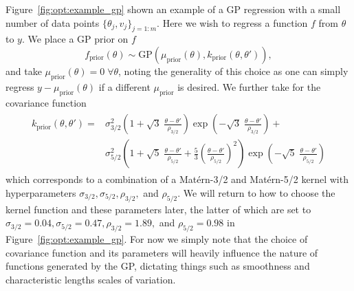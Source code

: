 Figure~\ref{fig:opt:example_gp} shown an example of a GP regression with a small
number of data points $\{\theta_j,{v}_j\}_{j=1:m}$.  Here we wish to regress a function $f$ 
from $\theta$ to $y$.  We place a GP prior on $f$
\[
f_{\mathrm{prior}} (\theta) \sim \mathrm{GP}\left(\mu_{\text{prior}} (\theta),k_{\text{prior}}(\theta,\theta')\right),
\]
and take $\mu_{\text{prior}} (\theta) = 0 \; \forall \theta$, noting the
generality of this choice as one can simply regress $y-\mu_{\text{prior}}(\theta)$ if
a different $\mu_{\text{prior}}$ is desired.  We further take for the covariance function
\begin{align}
\label{eq:opt:kprior}
\begin{split}
k_{\text{prior}}\left(\theta,\theta'\right) = & \sigma_{3/2}^2 \left(1+\sqrt{3} \; \frac{\theta-\theta'}{\rho_{3/2}}\right)\exp\left(-\sqrt{3} \;\frac{\theta-\theta'}{\rho_{3/2}}\right) +\\&\sigma_{5/2}^2 \left(1+\sqrt{5}\;\frac{\theta-\theta'}{\rho_{5/2}}+\frac{5}{3}\left(\frac{\theta-\theta'}{\rho_{5/2}}\right)^2\right)\exp\left(-\sqrt{5}\;\frac{\theta-\theta'}{\rho_{5/2}}\right)
\end{split}
\end{align}
which corresponds to a combination of a Mat\'{e}rn-3/2 and Mat\'{e}rn-5/2
kernel with hyperparameters $\sigma_{3/2}, \sigma_{5/2}, \rho_{3/2},$ and
$\rho_{5/2}$.  We will return to how to choose the kernel function and
these parameters later, the latter of which are set to
$\sigma_{3/2}=0.04, \sigma_{5/2}=0.47, \rho_{3/2}=1.89,$ and
$\rho_{5/2}=0.98$ in Figure~\ref{fig:opt:example_gp}.  For now we simply note
that the choice of covariance function and its parameters will heavily influence 
the nature of functions generated by the GP, dictating things such as smoothness 
and characteristic lengths scales of variation.

